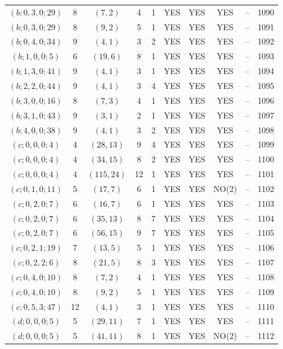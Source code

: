\begin{longtable}{|c|c|c|c|c|c|c|c|c|c|}
$(b; 0, 3, 0; 29)$ & 8 & $(7, 2)$ & 4 & 1 & YES & YES & YES & -- & 1090\\
$(b; 0, 3, 0; 29)$ & 8 & $(9, 2)$ & 5 & 1 & YES & YES & YES & -- & 1091\\
$(b; 0, 4, 0; 34)$ & 9 & $(4, 1)$ & 3 & 2 & YES & YES & YES & -- & 1092\\
$(b; 1, 0, 0; 5)$ & 6 & $(19, 6)$ & 8 & 1 & YES & YES & YES & -- & 1093\\
$(b; 1, 3, 0; 41)$ & 9 & $(4, 1)$ & 3 & 1 & YES & YES & YES & -- & 1094\\
$(b; 2, 2, 0; 44)$ & 9 & $(4, 1)$ & 3 & 4 & YES & YES & YES & -- & 1095\\
$(b; 3, 0, 0; 16)$ & 8 & $(7, 3)$ & 4 & 1 & YES & YES & YES & -- & 1096\\
$(b; 3, 1, 0; 43)$ & 9 & $(3, 1)$ & 2 & 1 & YES & YES & YES & -- & 1097\\
$(b; 4, 0, 0; 38)$ & 9 & $(4, 1)$ & 3 & 2 & YES & YES & YES & -- & 1098\\
$(c; 0, 0, 0; 4)$ & 4 & $(28, 13)$ & 9 & 4 & YES & YES & YES & -- & 1099\\
$(c; 0, 0, 0; 4)$ & 4 & $(34, 15)$ & 8 & 2 & YES & YES & YES & -- & 1100\\
$(c; 0, 0, 0; 4)$ & 4 & $(115, 24)$ & 12 & 1 & YES & YES & YES & -- & 1101\\
$(c; 0, 1, 0; 11)$ & 5 & $(17, 7)$ & 6 & 1 & YES & YES & NO(2) & -- & 1102\\
$(c; 0, 2, 0; 7)$ & 6 & $(16, 7)$ & 6 & 1 & YES & YES & YES & -- & 1103\\
$(c; 0, 2, 0; 7)$ & 6 & $(35, 13)$ & 8 & 7 & YES & YES & YES & -- & 1104\\
$(c; 0, 2, 0; 7)$ & 6 & $(56, 15)$ & 9 & 7 & YES & YES & YES & -- & 1105\\
$(c; 0, 2, 1; 19)$ & 7 & $(13, 5)$ & 5 & 1 & YES & YES & YES & -- & 1106\\
$(c; 0, 2, 2; 6)$ & 8 & $(21, 5)$ & 8 & 3 & YES & YES & YES & -- & 1107\\
$(c; 0, 4, 0; 10)$ & 8 & $(7, 2)$ & 4 & 1 & YES & YES & YES & -- & 1108\\
$(c; 0, 4, 0; 10)$ & 8 & $(9, 2)$ & 5 & 1 & YES & YES & YES & -- & 1109\\
$(c; 0, 5, 3; 47)$ & 12 & $(4, 1)$ & 3 & 1 & YES & YES & YES & -- & 1110\\
$(d; 0, 0, 0; 5)$ & 5 & $(29, 11)$ & 7 & 1 & YES & YES & YES & -- & 1111\\
$(d; 0, 0, 0; 5)$ & 5 & $(41, 11)$ & 8 & 1 & YES & YES & NO(2) & -- & 1112\\

\end{longtable}
